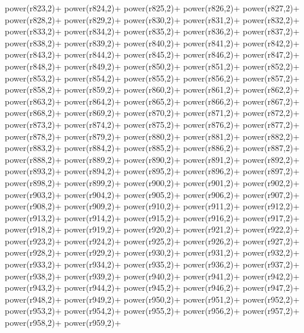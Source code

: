 \begin{DoxyCode}
{    power(r823,2)+
    power(r824,2)+
    power(r825,2)+
    power(r826,2)+
    power(r827,2)+
    power(r828,2)+
    power(r829,2)+
    power(r830,2)+
    power(r831,2)+
    power(r832,2)+
    power(r833,2)+
    power(r834,2)+
    power(r835,2)+
    power(r836,2)+
    power(r837,2)+
    power(r838,2)+
    power(r839,2)+
    power(r840,2)+
    power(r841,2)+
    power(r842,2)+
    power(r843,2)+
    power(r844,2)+
    power(r845,2)+
    power(r846,2)+
    power(r847,2)+
    power(r848,2)+
    power(r849,2)+
    power(r850,2)+
    power(r851,2)+
    power(r852,2)+
    power(r853,2)+
    power(r854,2)+
    power(r855,2)+
    power(r856,2)+
    power(r857,2)+
    power(r858,2)+
    power(r859,2)+
    power(r860,2)+
    power(r861,2)+
    power(r862,2)+
    power(r863,2)+
    power(r864,2)+
    power(r865,2)+
    power(r866,2)+
    power(r867,2)+
    power(r868,2)+
    power(r869,2)+
    power(r870,2)+
    power(r871,2)+
    power(r872,2)+
    power(r873,2)+
    power(r874,2)+
    power(r875,2)+
    power(r876,2)+
    power(r877,2)+
    power(r878,2)+
    power(r879,2)+
    power(r880,2)+
    power(r881,2)+
    power(r882,2)+
    power(r883,2)+
    power(r884,2)+
    power(r885,2)+
    power(r886,2)+
    power(r887,2)+
    power(r888,2)+
    power(r889,2)+
    power(r890,2)+
    power(r891,2)+
    power(r892,2)+
    power(r893,2)+
    power(r894,2)+
    power(r895,2)+
    power(r896,2)+
    power(r897,2)+
    power(r898,2)+
    power(r899,2)+
    power(r900,2)+
    power(r901,2)+
    power(r902,2)+
    power(r903,2)+
    power(r904,2)+
    power(r905,2)+
    power(r906,2)+
    power(r907,2)+
    power(r908,2)+
    power(r909,2)+
    power(r910,2)+
    power(r911,2)+
    power(r912,2)+
    power(r913,2)+
    power(r914,2)+
    power(r915,2)+
    power(r916,2)+
    power(r917,2)+
    power(r918,2)+
    power(r919,2)+
    power(r920,2)+
    power(r921,2)+
    power(r922,2)+
    power(r923,2)+
    power(r924,2)+
    power(r925,2)+
    power(r926,2)+
    power(r927,2)+
    power(r928,2)+
    power(r929,2)+
    power(r930,2)+
    power(r931,2)+
    power(r932,2)+
    power(r933,2)+
    power(r934,2)+
    power(r935,2)+
    power(r936,2)+
    power(r937,2)+
    power(r938,2)+
    power(r939,2)+
    power(r940,2)+
    power(r941,2)+
    power(r942,2)+
    power(r943,2)+
    power(r944,2)+
    power(r945,2)+
    power(r946,2)+
    power(r947,2)+
    power(r948,2)+
    power(r949,2)+
    power(r950,2)+
    power(r951,2)+
    power(r952,2)+
    power(r953,2)+
    power(r954,2)+
    power(r955,2)+
    power(r956,2)+
    power(r957,2)+
    power(r958,2)+
    power(r959,2)+
}
\end{DoxyCode}
